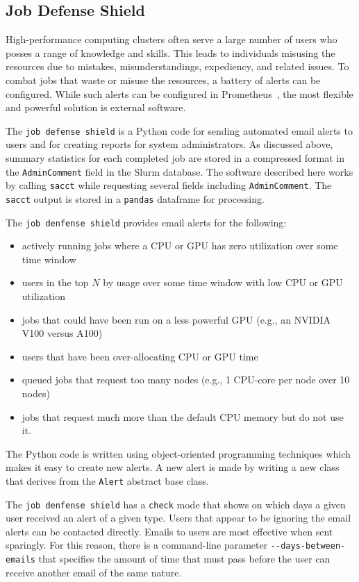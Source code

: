 \subsection{Job Defense Shield}
High-performance computing clusters often serve a large number of users who posses a range of knowledge and skills. This leads to individuals misusing the resources due to mistakes, misunderstandings, expediency, and related issues. To combat jobs that waste or misuse the resources, a battery of alerts can be configured. While such alerts can be configured in Prometheus~\cite{prometheus}, the most flexible and powerful solution is external software.

The \texttt{job defense shield} is a Python code for sending automated email alerts to users and for creating reports for system administrators. As discussed above, summary statistics for each completed job are stored in a compressed format in the \texttt{AdminComment} field in the Slurm database. The software described here works by calling \texttt{sacct} while requesting several fields including \texttt{AdminComment}. The \texttt{sacct} output is stored in a \texttt{pandas} dataframe for processing.

The \texttt{job denfense shield} provides email alerts for the following:

\begin{itemize}
\item actively running jobs where a CPU or GPU has zero utilization over some time window
\item users in the top $N$ by usage over some time window with low CPU or GPU utilization
\item jobs that could have been run on a less powerful GPU (e.g., an NVIDIA V100 versus A100)
\item users that have been over-allocating CPU or GPU time
\item queued jobs that request too many nodes (e.g., 1 CPU-core per node over 10 nodes)
\item jobs that request much more than the default CPU memory but do not use it.
\end{itemize}

The Python code is written using object-oriented programming techniques which makes it easy to create new alerts. A new alert is made by writing a new class that derives from the \texttt{Alert} abstract base class.

The \texttt{job denfense shield} has a \texttt{check} mode that shows on which days a given user received an alert of a given type. Users that appear to be ignoring the email alerts can be contacted directly. Emails to users are most effective when sent sparingly. For this reason, there is a command-line parameter \texttt{-{}-days-between-emails} that specifies the amount of time that must pass before the user can receive another email of the same nature.

